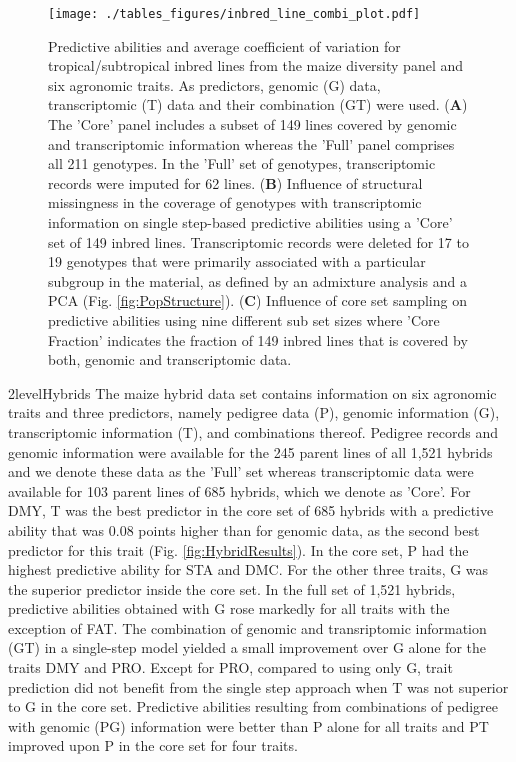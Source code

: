 \documentclass[12pt,titlepage]{article}
\begin{document}
\begin{figure}[H]
  \centering
  \texttt{[image: ./tables\_figures/inbred\_line\_combi\_plot.pdf]}
  \caption{
  Predictive abilities and average coefficient of variation for
  tropical/subtropical inbred lines from the maize diversity panel and six 
  agronomic traits.
  As predictors, genomic (G) data, transcriptomic (T) data and their 
  combination (GT) were used.
  (\textbf{A}) The 'Core' panel includes a subset of 149 lines covered by
  genomic and transcriptomic information whereas the 'Full' panel comprises all
  211 genotypes. In the 'Full' set of genotypes, transcriptomic records were
  imputed for 62 lines.
  (\textbf{B}) Influence of structural missingness in the coverage of genotypes 
  with transcriptomic information on single step-based predictive abilities 
  using a 'Core' set of 149 inbred lines.
  Transcriptomic records were deleted for 17 to 19 genotypes that were
  primarily associated with a particular subgroup in the material, as defined
  by an admixture analysis and a PCA (Fig. \ref{fig:PopStructure}).
  (\textbf{C}) Influence of core set sampling on predictive abilities using
  nine different sub set sizes where 'Core Fraction' indicates the fraction
  of 149 inbred lines that is covered by both, genomic and transcriptomic
  data.
  } 
  \label{fig:InbredResults}
\end{figure}



\Genetics2level{Hybrids}
The maize hybrid data set contains information on six agronomic traits and
three predictors, namely pedigree data (P), genomic information (G), 
transcriptomic information (T), and combinations thereof.
Pedigree records and genomic information were available for the 245 parent 
lines of all 1,521 hybrids and we denote these data as the 'Full' set whereas
transcriptomic data were available for 103 parent lines of 685 hybrids, which
we denote as 'Core'.
For DMY, T was the best predictor in the core set of 685 hybrids with a 
predictive ability that was 0.08 points higher than for genomic data, as the 
second best predictor for this trait (Fig. \ref{fig:HybridResults}).
In the core set, P had the highest predictive ability for STA and DMC.
For the other three traits, G was the superior predictor inside the core set.
In the full set of 1,521 hybrids, predictive abilities obtained with G rose 
markedly for all traits with the exception of FAT.
The combination of genomic and transriptomic information (GT) in a single-step
model yielded a small improvement over G alone for the traits DMY and PRO.
Except for PRO, compared to using only G, trait prediction did not benefit from 
the single step approach when T was not superior to G in the core set.
Predictive abilities resulting from combinations of pedigree with genomic (PG)
information were better than P alone for all traits and PT improved upon P in
the core set for four traits.
\end{document}
